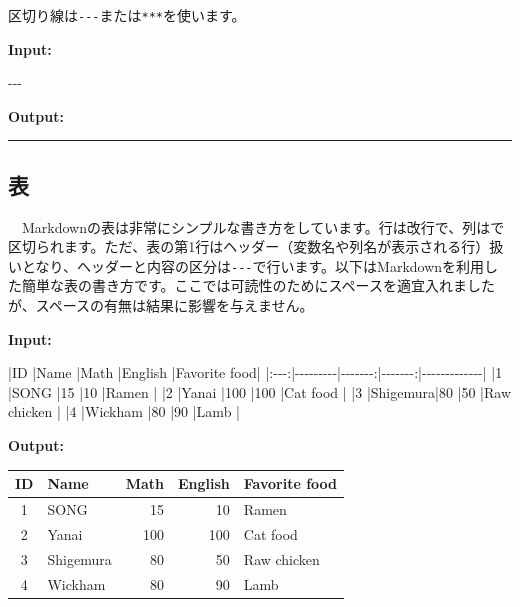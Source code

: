 \documentclass[
  a4paper,
  pandoc,
  ja=standard,
  jafont=haranoaji]{bxjsbook}
\newenvironment{Shaded}{\begin{snugshade}}{\end{snugshade}}
\newcommand{\CommentTok}[1]{\textcolor[rgb]{0.37,0.37,0.37}{#1}}
\newcommand{\NormalTok}[1]{\textcolor[rgb]{0.00,0.48,0.65}{#1}}
\begin{document}
区切り線は\texttt{-\/-\/-}または\texttt{***}を使います。

\textbf{Input:}

\begin{Shaded}
\begin{Highlighting}[]
\CommentTok{{-}{-}{-}}
\end{Highlighting}
\end{Shaded}

\textbf{Output:}

\begin{center}\rule{0.5\linewidth}{0.5pt}\end{center}

\hypertarget{ux8868}{%
\subsection{表}\label{ux8868}}

　Markdownの表は非常にシンプルな書き方をしています。行は改行で、列は\texttt{\textbar{}}で区切られます。ただ、表の第1行はヘッダー（変数名や列名が表示される行）扱いとなり、ヘッダーと内容の区分は\texttt{\textbar{}-\/-\/-\textbar{}}で行います。以下はMarkdownを利用した簡単な表の書き方です。ここでは可読性のためにスペースを適宜入れましたが、スペースの有無は結果に影響を与えません。

\textbf{Input:}

\begin{Shaded}
\begin{Highlighting}[]
\NormalTok{|ID   |Name     |Math    |English |Favorite food|}
\NormalTok{|:{-}{-}{-}:|{-}{-}{-}{-}{-}{-}{-}{-}{-}|{-}{-}{-}{-}{-}{-}{-}:|{-}{-}{-}{-}{-}{-}{-}:|{-}{-}{-}{-}{-}{-}{-}{-}{-}{-}{-}{-}{-}|}
\NormalTok{|1    |SONG     |15      |10      |Ramen        |}
\NormalTok{|2    |Yanai    |100     |100     |Cat food     |}
\NormalTok{|3    |Shigemura|80      |50      |Raw chicken  |}
\NormalTok{|4    |Wickham  |80      |90      |Lamb         |}
\end{Highlighting}
\end{Shaded}

\textbf{Output:}

\begin{longtable}[]{@{}clrrl@{}}
\toprule
ID & Name & Math & English & Favorite food \\
\midrule
\endhead
1 & SONG & 15 & 10 & Ramen \\
2 & Yanai & 100 & 100 & Cat food \\
3 & Shigemura & 80 & 50 & Raw chicken \\
4 & Wickham & 80 & 90 & Lamb \\
\bottomrule
\end{longtable}
\end{document}
